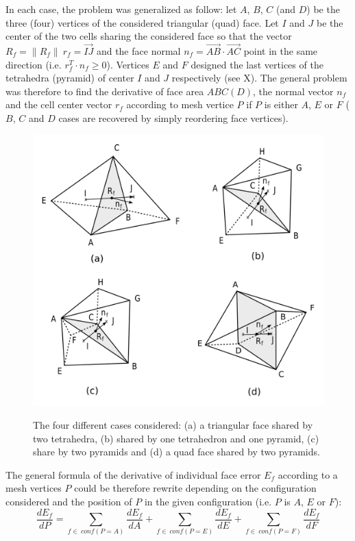 \documentclass[11pt]{article}
\begin{document}
In each case, the problem was generalized as follow: let $A$, $B$, $C$ (and $D$) be the three (four) vertices of the considered triangular (quad) face. 
Let $I$ and $J$ be the center of the two cells sharing the considered face so that the vector $R_f=\|R_f\|\ r_f = \overrightarrow{IJ}$ and the face normal $n_f = \overrightarrow{AB} \cdot \overrightarrow{AC}$ point in the same direction (i.e. $r_f^T \cdot n_f \geq 0$).
Vertices $E$ and $F$ designed the last vertices of the tetrahedra (pyramid) of center $I$ and $J$ respectively (see X).
The general problem was therefore to find the derivative of face area $ABC(D)$, the normal vector $n_f$ and the cell center vector $r_f$ according to mesh vertice $P$ if $P$ is either $A$, $E$ or $F$ ($B$, $C$ and $D$ cases are recovered by simply reordering face vertices). 

\begin{figure}[h]
  \centering
  \includegraphics[width=\textwidth]{figures/cases.png}
  \label{cases_figure}
  \caption{The four different cases considered: (a) a triangular face shared by two tetrahedra, (b) shared by one tetrahedron and one pyramid, (c) share by two pyramids and (d) a quad face shared by two pyramids.}
\end{figure}

The general formula of the derivative of individual face error $E_f$ according to a mesh vertices $P$ could be therefore rewrite depending on the configuration considered and the position of $P$ in the given configuration (i.e. $P$ is $A$, $E$ or $F$):
\begin{equation}
\frac{dE_f}{dP} = \sum_{f\in\ conf(P=A)} \frac{dE_f}{dA} + \sum_{f\in\ conf(P=E)} \frac{dE_f}{dE} +
\sum_{f\in\ conf(P=F)} \frac{dE_f}{dF} 
\end{equation}
\end{document}
